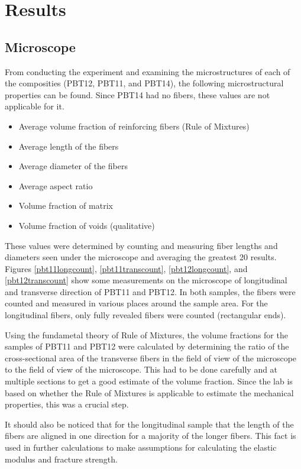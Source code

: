 \documentclass[11pt]{article}
\begin{document}
\section{Results}
\subsection{Microscope}
From conducting the experiment and examining the microstructures of each of the composities (PBT12, PBT11, and PBT14), the following microstructural properties can be found. Since PBT14 had no fibers, these values are not applicable for it.

\begin{itemize}
\item Average volume fraction of reinforcing fibers (Rule of Mixtures)
\item Average length of the fibers
\item Average diameter of the fibers
\item Average aspect ratio
\item Volume fraction of matrix
\item Volume fraction of voids (qualitative)
\end{itemize}

These values were determined by counting and measuring fiber lengths and diameters seen under the microscope and averaging the greatest 20 results. Figures \ref{pbt11longcount}, \ref{pbt11transcount}, \ref{pbt12longcount}, and \ref{pbt12transcount} show some measurements on the microscope of longitudinal and transverse direction of PBT11 and PBT12. In both samples, the fibers were counted and measured in various places around the sample area. For the longitudinal fibers, only fully revealed fibers were counted (rectangular ends). 

Using the fundametal theory of Rule of Mixtures, the volume fractions for the samples of PBT11 and PBT12 were calculated by determining the ratio of the cross-sectional area of the transverse fibers in the field of view of the microscope to the field of view of the microscope. This had to be done carefully and at multiple sections to get a good estimate of the volume fraction. Since the lab is based on whether the Rule of Mixtures is applicable to estimate the mechanical properties, this was a crucial step.

It should also be noticed that for the longitudinal sample that the length of the fibers are aligned in one direction for a majority of the longer fibers. This fact is used in further calculations to make assumptions for calculating the elastic modulus and fracture strength.
\end{document}
